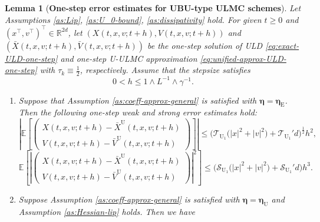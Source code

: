\documentclass[12pt]{article}
\newenvironment{redtext}
  {\color{black}\ignorespaces}
  {\ignorespacesafterend}
\numberwithin{equation}{section}
\newtheorem{lem}{Lemma}[section]
\begin{document}




\begin{redtext}



\begin{lem}[\textbf{One-step error estimates for UBU-type ULMC schemes}]
\label{lem:one-step-weak-strong-error-UBU}
Let Assumptions \ref{as:Lip}, \ref{as:U_0-bound}, \ref{as:dissipativity} hold. 
For given $t\geq0$ and $(x^\top,v^\top)^\top\in\mathbb R^{2d}$, let
\(
(X(t,x,v;t+h),V(t,x,v;t+h))
\)
and 
\(
(\bar X(t,x,v;t+h),\bar V(t,x,v;t+h))
\)
be the one-step solution of ULD \eqref{eq:exact-ULD-one-step} and one-step U-ULMC approximation \eqref{eq:unified-approx-ULD-one-step} with $\tau_k \equiv \frac{1}{2}$, respectively.
Assume that the stepsize satisfies
\[
0<h\leq 1\wedge L^{-1}\wedge \gamma^{-1}.
\]
\begin{enumerate}
\item Suppose that Assumption \ref{as:coeff-approx-general}  is satisfied with $\boldsymbol{\eta} = \boldsymbol{\eta}_\mathrm{E}$. Then the following one-step weak and strong error estimates hold:
\begin{equation}
\label{eq:one-step-weak-error-UBU-gl}
\left|
\mathbb E
\left[
\left(
\begin{aligned}
X(t,x,v;t+h)
-
\bar X^{\mathrm U}(t,x,v;t+h)
\\
V(t,x,v;t+h)
-
\bar V^{\mathrm U}(t,x,v;t+h)
\end{aligned}
\right)
\right]
\right|
\leq
\Big(
\mathcal T_{\mathrm{U}_1}
\big(
|x|^2+|v|^2
\big)
+
\mathcal T_{\mathrm{U}_1}'d
\Big)^{\frac{1}{2}}
h^{2},
\end{equation}
\begin{equation}
\label{eq:one-step-strong-error-UBU-gl}
\mathbb E
\left[
\left|
\left(
\begin{aligned}
X(t,x,v;t+h)-\bar X^{\mathrm U}(t,x,v;t+h)
\\
V(t,x,v;t+h)-\bar V^{\mathrm U}(t,x,v;t+h)
\end{aligned}
\right)
\right|^2
\right]
\leq
\Big(
\mathcal S_{\mathrm{U}_1}
\big(
|x|^2+|v|^2
\big)
+
\mathcal S_{\mathrm{U}_1}'d
\Big)h^{3}.
\end{equation}
\item 
Suppose Assumption \ref{as:coeff-approx-general} is satisfied with $\boldsymbol{\eta}=\boldsymbol{\eta}_\mathrm{U}$ and Assumption \ref{as:Hessian-lip} holds. Then we have

\end{enumerate}
\end{lem}
\end{redtext}
\end{document}
